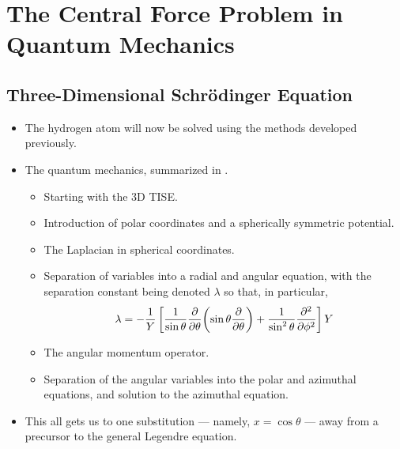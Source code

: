 \documentclass[../finalProject.tex]{subfiles}
\begin{document}
\section{The Central Force Problem in Quantum Mechanics}
\subsection{Three-Dimensional Schr\"{o}dinger Equation}
\begin{itemize}
    \item {}The hydrogen atom will now be solved using the methods developed previously.
    \item The quantum mechanics, summarized in \textcite[56-58]{bib:CHEM26100Notes}.
    \begin{itemize}
        \item Starting with the 3D TISE.
        \item Introduction of polar coordinates and a spherically symmetric potential.
        \item The Laplacian in spherical coordinates.
        \item Separation of variables into a radial and angular equation, with the separation constant being denoted $\lambda$ so that, in particular,
        \begin{equation*}
            \lambda = -\frac{1}{Y}\left[ \frac{1}{\sin\theta}\pdv{\theta}(\sin\theta\pdv{\theta})+\frac{1}{\sin^2\theta}\pdv[2]{\phi} \right]Y
        \end{equation*}
        \item The angular momentum operator.
        \item Separation of the angular variables into the polar and azimuthal equations, and solution to the azimuthal equation.
    \end{itemize}
    \item This all gets us to one substitution --- namely, $x=\cos\theta$ --- away from a precursor to the general Legendre equation.
\end{itemize}
\end{document}
